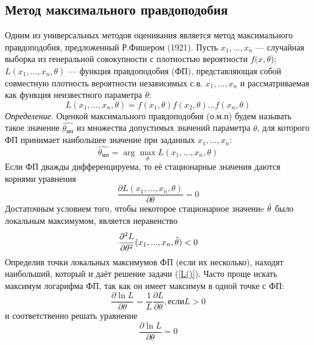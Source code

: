 \documentclass[12pt,a4paper]{scrartcl}
\begin{document}
\subsection{Метод максимального правдоподобия}
	Одним из универсальных методов оценивания является метод максимального правдоподобия, предложенный Р.Фишером (1921).
    Пусть $x_{1},...,x_{n}$ — случайная выборка из генеральной совокупности с плотностью вероятности $f(x,\theta$); $L(x_{1},... ,x_{n}, \theta)$ — функция правдоподобия (ФП), представляющая собой совместную плотность вероятности независимых с.в. $x_{1}, ... ,x_{n}$ и рассматриваемая как функция неизвестного параметра $\theta$:
    \begin{equation}
        L(x_{1},...,x_{n},\theta) = f(x_{1},\theta)f(x_{2},\theta)...f(x_{n}, \theta)
        \label{L()}
    \end{equation}
    \textit{Определение}. Оценкой максимального правдоподобия (о.м.п) будем называть такое значение $\hat{\theta_{мп}}$ из множества допустимых значений параметра $\theta$, для которого ФП принимает наибольшее значение при заданных $x_{1},...,x_{n}$:
    \begin{equation}
        \hat{\theta_{мп}} = \arg \max_{\theta}L(x_{1},...,x_{n},\theta)
        \label{theta_mp}
    \end{equation}
    Если ФП дважды дифференцируема, то её стационарные значения даются корнями уравнения
    \begin{equation}
        \frac{\partial L(x_{1},...,x_{n},\theta)}{\partial \theta} = 0
        \label{eq_min}
    \end{equation}
    Достаточным условием того, чтобы некоторое стационарное значениe $\Tilde{\theta}$ было локальным максимумом, является неравенство
    \begin{equation}
        \frac{\partial^{2}L}{\partial \theta^{2}}(x_{1},...,x_{n},\Tilde{\theta}) < 0
        \label{ineq_min}
    \end{equation}
    Определив точки локальных максимумов ФП (если их несколько), находят наибольший, который и даёт решение задачи (\ref{L()}).
    Часто проще искать максимум логарифма ФП, так как он имеет максимум в одной точке с ФП:
    \begin{equation}
        \frac{\partial \ln L}{\partial \theta}=\frac{1}{L}\frac{\partial L}{\partial \theta}, если L > 0
        \label{log_max}
    \end{equation}
    и соответственно решать уравнение
    \begin{equation}
         \frac{\partial \ln L}{\partial \theta}= 0
         \label{log_m=0}
    \end{equation}
\end{document}
